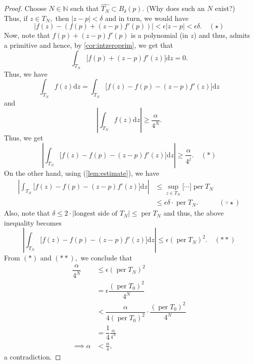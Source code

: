 \begin{proof}
	Choose $N \in \mathbb{N}$ such that $\widehat{T_N} \subset B_\delta(p).$ (Why does such an $N$ exist?)\\
	Thus, if $z \in T_N,$ then $|z - p| < \delta$ and in turn, we would have
	\begin{equation*} 
		\left|f(z) - (f(p) + (z - p)f'(p))\right| < \epsilon|z - p| < \epsilon\delta. \quad (\star)
	\end{equation*}
	Now, note that $f(p) + (z - p)f'(p)$ is a polynomial (in $z$) and thus, admits a primitive and hence, by \cref{cor:intzeroprim}, we get that
	\begin{equation*} 
		\int_{T_N}\Big[f(p) + (z - p)f'(z)\Big]\mathrm{d}z = 0.
	\end{equation*}
	Thus, we have
	\begin{equation*} 
		\int_{T_N} f(z)\mathrm{d}z = \int_{T_N}^{} \Big[f(z) - f(p) - (z - p)f'(z)\Big] \mathrm{d}z
	\end{equation*}
	and 
	\begin{equation*} 
		\left|\int_{T_N}^{} f(z) \mathrm{d}z\right| \ge \dfrac{\alpha}{4^N}.
	\end{equation*}
	Thus, we get
	\begin{equation*} 
		\left|\int_{T_N}^{} \Big[f(z) - f(p) - (z - p)f'(z)\Big] \mathrm{d}z\right| \ge \dfrac{\alpha}{4^j}. \quad (*)
	\end{equation*}
	On the other hand, using  (\cref{lem:estimate}), we have
	\begin{align*} 
		\left|\int_{T_N}^{} \Big[f(z) - f(p) - (z - p)f'(z)\Big] \mathrm{d}z\right| &\le \sup_{z \in T_N}\Big[\cdots\Big]\operatorname{per} T_N\\
		&\le \epsilon\delta\cdot\operatorname{per} T_N. & (\because \star)
	\end{align*}
	Also, note that $\delta \le 2\cdot\left|\text{longest side of }T_N\right| \le \operatorname{per}T_N$ and thus, the above inequality becomes
	\begin{equation*} 
		\left|\int_{T_N}^{} \Big[f(z) - f(p) - (z - p)f'(z)\Big] \mathrm{d}z\right| \le \epsilon\left(\operatorname{per}T_N\right)^2. \quad (**)
	\end{equation*}
	From $(*)$ and $(**),$ we conclude that
	\begin{align*} 
		\dfrac{\alpha}{4^N} &\le \epsilon\left(\operatorname{per}T_N\right)^2\\
		&= \epsilon \dfrac{(\operatorname{per}T_0)^2}{4^N}\\
		&<\dfrac{\alpha}{4(\operatorname{per} T_0)^2}\cdot\dfrac{(\operatorname{per}T_0)^2}{4^N}\\
		&= \dfrac{1}{4}\frac{\alpha}{4^N}\\
		\implies \alpha &< \frac{\alpha}{4},
	\end{align*}
	a contradiction.
\end{proof}


